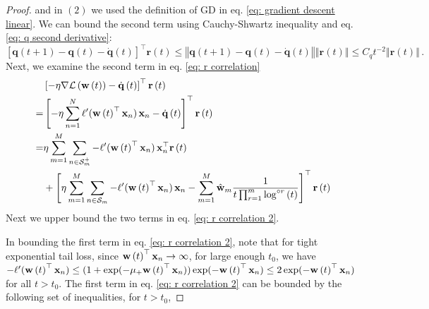 \documentclass[twoside,11pt,english]{article}
\begin{document}
{\begin{proof}
and in $\left(2\right)$ we used the definition of GD in eq. \ref{eq: gradient descent linear}.
We can bound the second term using Cauchy-Shwartz inequality and eq.
\ref{eq: q second derivative}:
\[
\left[\mathbf{q}\left(t+1\right)-\mathbf{q}\left(t\right)-\dot{\mathbf{q}}\left(t\right)\right]^{\top}\mathbf{r}\left(t\right)\leq\left\Vert \mathbf{q}\left(t+1\right)-\mathbf{q}\left(t\right)-\dot{\mathbf{q}}\left(t\right)\right\Vert \left\Vert \mathbf{r}\left(t\right)\right\Vert \leq C_{q}t^{-2}\left\Vert \mathbf{r}\left(t\right)\right\Vert \,.
\]
Next, we examine the second term in eq. \ref{eq: r correlation}
\begin{align}
 & \left[-\eta\nabla\mathcal{L}\left(\mathbf{w}\left(t\right)\right)-\dot{\mathbf{q}}\left(t\right)\right]^{\top}\mathbf{r}\left(t\right)\nonumber \\
= & \left[-\eta\sum_{n=1}^{N}\ell'(\mathbf{w}\left(t\right)^{\top}\mathbf{x}_{n})\,\mathbf{x}_{n}-\dot{\mathbf{q}}\left(t\right)\right]^{\top}\mathbf{r}\left(t\right)\nonumber \\
= & \eta\sum_{m=1}^{M}\sum_{n\in\mathcal{S}_{m}^{+}}-\ell'(\mathbf{w}\left(t\right)^{\top}\mathbf{x}_{n})\,\mathbf{x}_{n}^{\top}\mathbf{r}\left(t\right) \nonumber \\
&+  \left[\eta\sum_{m=1}^{M}\sum_{n\in\mathcal{S}_{m}}-\ell'(\mathbf{w}\left(t\right)^{\top}\mathbf{x}_{n})\,\mathbf{x}_{n}-\sum_{m=1}^{M}\hat{\mathbf{w}}_{m}\frac{1}{t\prod_{r=1}^{m}\log^{\circ r}\left(t\right)}\right]^{\top}\mathbf{r}\left(t\right)\label{eq: r correlation 2}
\end{align}
Next we upper bound the two terms in eq. \ref{eq: r correlation 2}.

In bounding the first term in eq. \ref{eq: r correlation 2}, note that for tight exponential tail loss, since $\mathbf{w}\left(t\right)^{\top}\mathbf{x}_{n}\to\infty$, for large enough $t_0$, we have $-\ell'(\mathbf{w}\left(t\right)^{\top}\mathbf{x}_{n})\le (1+\exp(-\mu_+\mathbf{w}\left(t\right)^{\top}\mathbf{x}_{n}))\exp(-\mathbf{w}\left(t\right)^{\top}\mathbf{x}_{n})\le 2\exp(-\mathbf{w}\left(t\right)^{\top}\mathbf{x}_{n})$ for all $t>t_0$. 
The first term in eq. \ref{eq: r correlation 2} can be bounded by the following set of inequalities, for $t>t_0$, 


\end{proof}}
\end{document}
